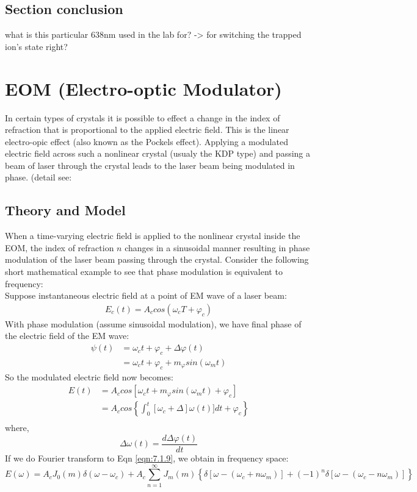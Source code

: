 \documentclass[11pt,A4Paper]{article}
\begin{document}
\subsection{Section conclusion}
what is this particular 638nm used in the lab for? -> for switching the trapped ion's state right? 


\section{EOM (Electro-optic Modulator)}
In certain types of crystals it is possible to effect a change in the index of refraction that is proportional to the applied electric field. This is the linear electro-opic effect (also known as the Pockels effect). Applying a modulated electric field across such a nonlinear crystal (usualy the KDP type) and passing a beam of laser through the crystal leads to the laser beam being modulated in phase. (detail see: \cite{fundamentalsOfPhotonics}

\subsection{Theory and Model}
When a time-varying electric field is applied to the nonlinear crystal inside the EOM, the index of refraction $n$ changes in a sinusoidal manner resulting in phase modulation of the laser beam passing through the crystal. Consider the following short mathematical example to see that phase modulation is equivalent to frequency: 
\\
Suppose instantaneous electric field at a point of EM wave of a laser beam: 
\begin{align*}
    E_c(t) = A_c cos(\omega_c T + \varphi_c)
\end{align*}
With phase modulation (assume sinusoidal modulation), we have final phase of the electric field of the EM wave: 
\begin{align*}
    \psi(t) &= \omega_c t + \varphi_c + \Delta \varphi (t) \\
            &= \omega_c t + \varphi_c + m_{\varphi} sin(\omega_m t)
\end{align*}
So the modulated electric field now becomes: 
\begin{align}
    E(t) &= A_c cos[ \omega_c t + m_{\varphi} sin(\omega_m t) + \varphi_c] \label{eqn:7.1.9}\\
         &= A_c cos\left\{  \int_0^t [ \omega_c + \Delta ]\omega(t)] dt + \varphi_c \right\} \\
\end{align}
where, 
\begin{equation*}
    \Delta \omega (t) = \frac{d\Delta \varphi (t)}{dt}
\end{equation*}
If we do Fourier transform to Eqn \ref{eqn:7.1.9}, we obtain in frequency space: 
\begin{equation}
    E(\omega) = A_c J_0(m) \delta(\omega - \omega_c) + A_c\sum_{n=1}^\infty J_m(m) \left\{ \delta[\omega-(\omega_c + n\omega_m)] +(-1)^n\delta[\omega-(\omega_c-n\omega_m)]\right\}
    \label{eqn:7.1.10}
\end{equation}
\end{document}
